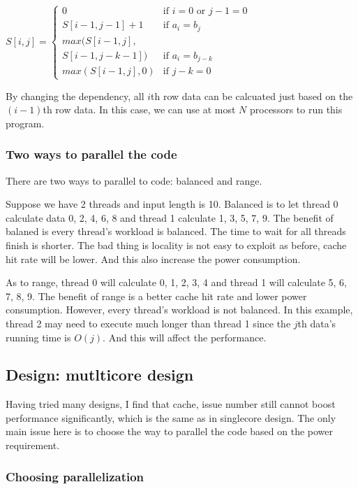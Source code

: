 \documentclass[twocolumn,letterpaper,10pt]{article}
\begin{document}
$ S[i,j] = 
\begin{cases}
 0 & \text{if }i=0\text{ or }j-1=0 \\
 S[i-1,j-1]+1 & \text{if }a_i=b_j \\
 max(S[i-1,j],\\ S[i-1,j-k-1]) & \text{if }a_i=b_{j-k} \\
 max(S[i-1,j],0) & \text{if }j-k=0
\end{cases} $

By changing the dependency, all $i$th row data can be calcuated just based on the $(i-1)$th row data. In this case, we can use at most $N$ processors to run this program.

\subsubsection{Two ways to parallel the code}

There are two ways to parallel to code: balanced and range.

Suppose we have 2 threads and input length is 10. Balanced is to let thread 0 calculate data 0, 2, 4, 6, 8 and thread 1 calculate 1, 3, 5, 7, 9. The benefit of balaned is every thread's workload is balanced. The time to wait for all threads finish is shorter. The bad thing is locality is not easy to exploit as before, cache hit rate will be lower. And this also increase the power consumption.

As to range, thread 0 will calculate 0, 1, 2, 3, 4 and thread 1 will calculate 5, 6, 7, 8, 9. The benefit of range is a better cache hit rate and lower power consumption. However, every thread's workload is not balanced. In this example, thread 2 may need to execute much longer than thread 1 since the $j$th data's running time is $O(j)$. And this will affect the performance.

\subsection{Design: mutlticore design}

Having tried many designs, I find that cache, issue number still cannot boost performance significantly, which is the same as in singlecore design. The only main issue here is to choose the way to parallel the code based on the power requirement.

\subsubsection{Choosing parallelization}
\end{document}
